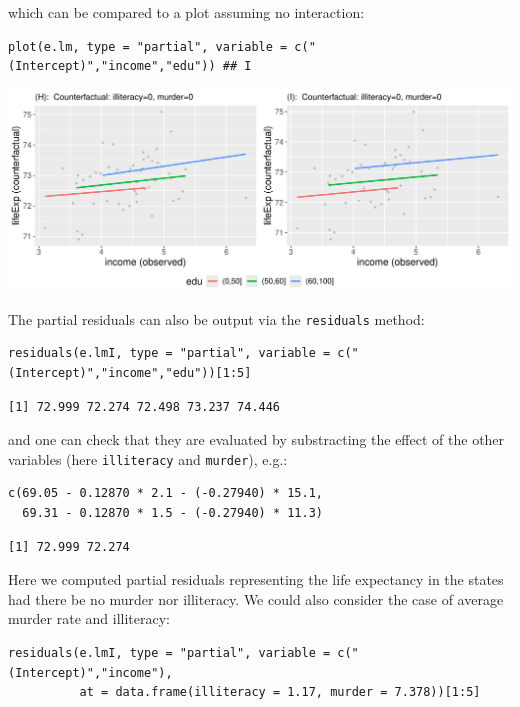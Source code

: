 \documentclass[12pt]{article}
\begin{document}
which can be compared to a plot assuming no interaction:
\lstset{language=r,label= ,caption= ,captionpos=b,numbers=none}
\begin{lstlisting}
plot(e.lm, type = "partial", variable = c("(Intercept)","income","edu")) ## I
\end{lstlisting}

\begin{center}
\includegraphics[trim={0 0 0 0},width=1\textwidth]{./figures/gg-lmpres-interaction.pdf}
\end{center}


The partial residuals can also be output via the \texttt{residuals} method:
\lstset{language=r,label= ,caption= ,captionpos=b,numbers=none}
\begin{lstlisting}
residuals(e.lmI, type = "partial", variable = c("(Intercept)","income","edu"))[1:5]
\end{lstlisting}

\begin{verbatim}
[1] 72.999 72.274 72.498 73.237 74.446
\end{verbatim}


and one can check that they are evaluated by substracting the effect
of the other variables (here \texttt{illiteracy} and \texttt{murder}), e.g.:
\lstset{language=r,label= ,caption= ,captionpos=b,numbers=none}
\begin{lstlisting}
c(69.05 - 0.12870 * 2.1 - (-0.27940) * 15.1,
  69.31 - 0.12870 * 1.5 - (-0.27940) * 11.3)
\end{lstlisting}

\begin{verbatim}
[1] 72.999 72.274
\end{verbatim}


Here we computed partial residuals representing the life expectancy in
the states had there be no murder nor illiteracy. We could also
consider the case of average murder rate and illiteracy:
\lstset{language=r,label= ,caption= ,captionpos=b,numbers=none}
\begin{lstlisting}
residuals(e.lmI, type = "partial", variable = c("(Intercept)","income"),
          at = data.frame(illiteracy = 1.17, murder = 7.378))[1:5]
\end{lstlisting}
\end{document}

